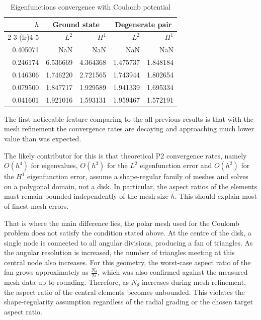 \documentclass[acmsmall,screen]{MapleTrans}
\begin{document}
\begin{table}[H]
    \centering
    \caption{Eigenfunctions convergence with Coulomb potential}
    \label{tab:coulomb eigfunc conv}
    \begin{tabular}{rrrrr}
        \toprule
        $h$ & \multicolumn{2}{c}{Ground state} & \multicolumn{2}{c}{Degenerate pair} \\
        \cmidrule(lr){2-3}
        \cmidrule(lr){4-5}
        & $L^2$ & $H^1$ & $L^2$ & $H^1$ \\
        \midrule
        0.405071 & NaN & NaN & NaN & NaN \\
        0.246174 & 6.536669 & 4.364368 & 1.475737 & 1.848184 \\
        0.146306 & 1.746220 & 2.721565 & 1.743944 & 1.802654 \\
        0.079500 & 1.847717 & 1.929589 & 1.941339 & 1.695334 \\
        0.041601 & 1.921016 & 1.593131 & 1.959467 & 1.572191 \\
        \bottomrule
    \end{tabular}
\end{table}

The first noticeable feature comparing to the all previous results is that with the mesh refinement the convergence rates are decaying and approaching much lower value than was expected. 

The likely contributor for this is that theoretical P2 convergence rates, namely $O(h^4)$ for eigenvalues, $O(h^3)$ for the $L^2$ eigenfunction error and $O(h^2)$ for the $H^1$ eigenfunction error, assume a shape-regular family of meshes and solves on a polygonal domain, not a disk. In particular, the aspect ratios of the elements must remain bounded independently of the mesh size $h$. This should explain most of finest-mesh errors.

That is where the main difference lies, the polar mesh used for the Coulomb problem does not satisfy the condition stated above. At the centre of the disk, a single node is connected to all angular divisions, producing a fan of triangles. As the angular resolution is increased, the number of triangles meeting at this central node also increases. For this geometry, the worst-case aspect ratio of the fan grows approximately as $\frac{N_{\theta}}{2\pi}$, which was also confirmed against the measured mesh data up to rounding. Therefore, as $N_\theta$ increases during mesh refinement, the aspect ratio of the central elements becomes unbounded. This violates the shape-regularity assumption regardless of the radial grading or the chosen target aspect ratio.
\end{document}
